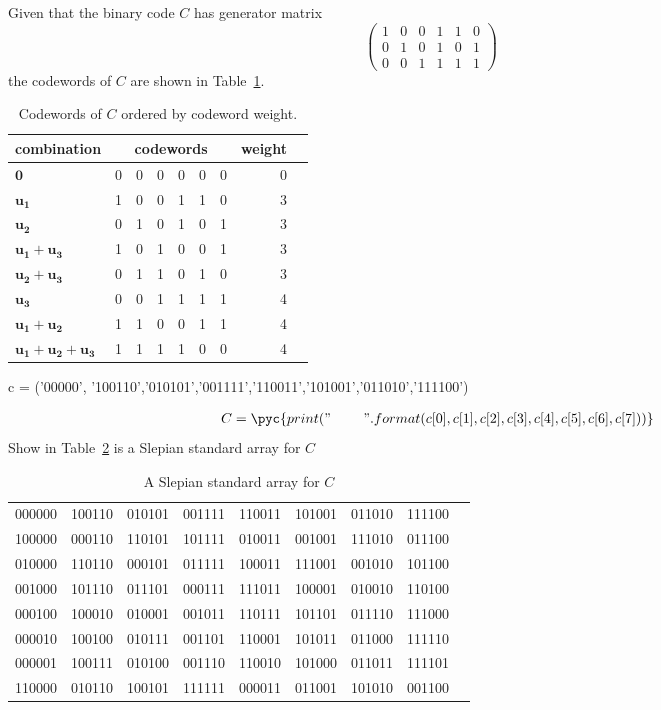 Given that the binary code $C$ has generator matrix
$$
\begin{pmatrix} 
1&0&0&1&1&0\\
0&1&0&1&0&1\\
0&0&1&1&1&1
\end{pmatrix}
\quad
$$
the codewords of $C$ are shown in Table~\ref{tab:8}.
\begin{table}[!htp]\centering
\begin{tabular}{lrrrrrrrr}\toprule
\textbf{combination} &\multicolumn{6}{c}{\textbf{codewords}} &\textbf{weight} \\\midrule
$\bm{0}$ &0 &0 &0 &0 &0 &0 &0 \\
$\bm{u_1}$ &1 &0 &0 &1 &1 &0 &3 \\
$\bm{u_2}$ &0 &1 &0 &1 &0 &1 &3 \\
$\bm{u_1}+\bm{u_3}$ &1 &0 &1 &0 &0 &1 &3 \\
$\bm{u_2}+\bm{u_3}$ &0 &1 &1 &0 &1 &0 &3 \\
$\bm{u_3}$ &0 &0 &1 &1 &1 &1 &4 \\
$\bm{u_1}+\bm{u_2}$ &1 &1 &0 &0 &1 &1 &4 \\
$\bm{u_1}+\bm{u_2+u_3}$ &1 &1 &1 &1 &0 &0 &4 \\
\bottomrule
\end{tabular}
\caption{Codewords of $C$ ordered by codeword weight.}\label{tab:8}
\end{table}
\begin{pycode}
c = ('00000', '100110','010101','001111','110011','101001','011010','111100')
\end{pycode}
\begin{align*}
C = \pyc{print("{}\ {}\ {}\ {}\ {}\ {}\ {}\ {}".format(c[0],c[1],c[2],c[3],c[4],c[5],c[6],c[7]))}
\end{align*}
Show in Table~\ref{tab:9} is a Slepian standard array for $C$
\begin{table}[!htp]\centering
\begin{tabular}{l|rrrrrrrr}\toprule
000000 &100110 &010101 &001111 &110011 &101001 &011010 &111100 \\
100000 &000110 &110101 &101111 &010011 &001001 &111010 &011100 \\
010000 &110110 &000101 &011111 &100011 &111001 &001010 &101100 \\
001000 &101110 &011101 &000111 &111011 &100001 &010010 &110100 \\
000100 &100010 &010001 &001011 &110111 &101101 &011110 &111000 \\
000010 &100100 &010111 &001101 &110001 &101011 &011000 &111110 \\
000001 &100111 &010100 &001110 &110010 &101000 &011011 &111101 \\
110000 &010110 &100101 &111111 &000011 &011001 &101010 &001100 \\
\bottomrule
\end{tabular}
\caption{A Slepian standard array for $C$}\label{tab:9}
\end{table}

